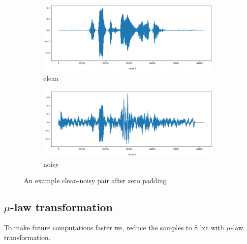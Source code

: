 \documentclass[12pt]{article}
\begin{document}
\begin{figure}[H]
		\begin{subfigure}{.5\textwidth}
			\centering
			\includegraphics[width=.8\linewidth]{wave_clean_padded}
			\caption{clean}
			\label{fig:wave_clean_padded}
		\end{subfigure}%
		\begin{subfigure}{.5\textwidth}
			\centering
			\includegraphics[width=.8\linewidth]{wave_noisy_padded}
			\caption{noisy}
			\label{fig:wave_noisy_padded}
		\end{subfigure}
		\caption{An example clean-noisy pair after zero padding}
		\label{fig:clean_noisy_padded}
	\end{figure}

	\subsection{\boldmath$\mu$-law transformation} \label{mulaw}
	To make future computations faster we, reduce the samples to 8 bit with $\mu$-law transformation.
	
\end{document}
